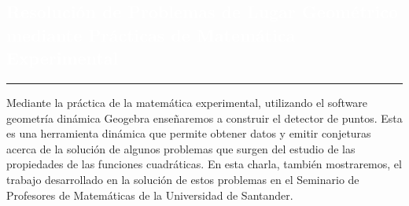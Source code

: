 \begin{titlepage}
\pagecolor{white}
\newcommand{\R}{\ensuremath{\mathbb{R}}}
\BgThispage
{}
\vspace*{-1.1cm}
\noindent
\def\titulo#1{\section{#1}}

\section{\bf\large\textcolor{white}{Resoluci\'on de Problemas de Lugar
 Geom\'etrico mediante Pr\'acticas de Matem\'atica Experimental}}
\vspace*{2cm}\par
\noindent

\begin{minipage}{0.5\linewidth}
\begin{minipage}{0.45\linewidth}
    \begin{flushright}
        \printauthor
    \end{flushright}
\end{minipage} \hspace{-3pt}
%
\begin{minipage}{0.02\linewidth}
   \color{ptctitle} \rule{1pt}{245pt}
\end{minipage} 
\end{minipage}
\hspace*{-4.5cm}
\begin{minipage}{0.85\linewidth}
\begin{minipage}{0.85\linewidth}
\footnotesize
\vspace{5pt}
    \begin{resumen}
    Mediante la pr\'actica de la matem\'atica experimental, utilizando el software geometr\'ia din\'amica Geogebra ense\~naremos a construir el detector de puntos. Esta es una herramienta din\'amica que permite obtener datos y emitir conjeturas acerca de la soluci\'on de algunos problemas que surgen del estudio de las propiedades de las funciones cuadr\'aticas. En esta charla, tambi\'en mostraremos, el trabajo desarrollado en la soluci\'on de estos problemas en el Seminario de Profesores de Matem\'aticas de la Universidad  de Santander.
    \end{resumen}
\end{minipage}
\vspace*{5pt}\\
\footnotesize
%  
    

\end{minipage}
\end{titlepage}
